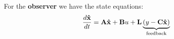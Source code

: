 For the \textbf{observer} we have the state equations:
\[
\frac{{d{\bf{\hat x}}}}{{dt}} = {\bf{A\hat x}} + {\bf{B}}u + {\bf{L}}\underbrace {(y - {\bf{C\hat x}})}_{{\rm{feedback}}}
\]



\endinput

